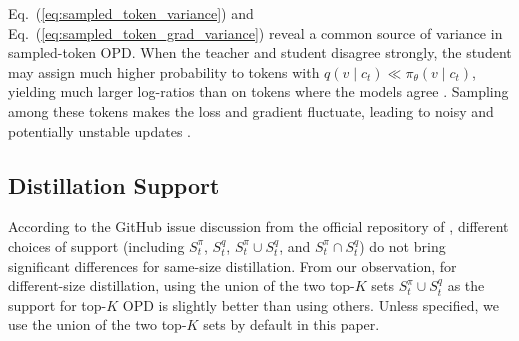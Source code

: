 \documentclass{article} %
\begin{document}
Eq.~(\ref{eq:sampled_token_variance}) and Eq.~(\ref{eq:sampled_token_grad_variance}) reveal a common source of variance in sampled-token OPD.
When the teacher and student disagree strongly, the student may assign much higher probability to tokens with $q(v\mid c_t)\ll\pi_\theta(v\mid c_t)$, yielding much larger log-ratios than on tokens where the models agree \citep{fu2026revisiting}. Sampling among these tokens makes the loss and gradient fluctuate, leading to noisy and potentially unstable updates \citep{oh2026klforkl}.

\subsection{Distillation Support} 
According to the GitHub issue discussion from the official repository of \citet{li2026rethinking}, different choices of support (including $S_t^\pi$, $S_t^q$, $S_t^\pi\cup S_t^q$, and $S_t^\pi\cap S_t^q$) do not bring significant differences for same-size distillation. From our observation, for different-size distillation, using the union of the two top-$K$ sets $S_t^\pi\cup S_t^q$ as the support for top-$K$ OPD is slightly better than using others. Unless specified, we use the union of the two top-$K$ sets by default in this paper.
\end{document}
